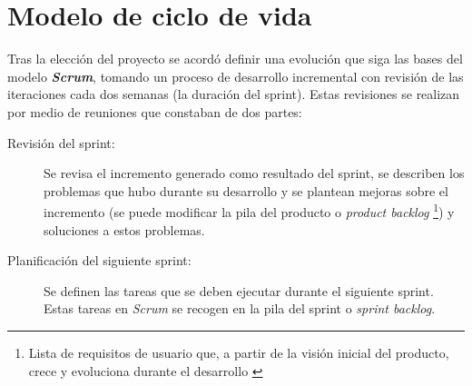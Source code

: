 \section{Modelo de ciclo de vida}

Tras la elección del proyecto se acordó definir una evolución que siga las bases del modelo \textit{\textbf{Scrum}}, tomando un proceso de desarrollo incremental con revisión de las iteraciones cada dos semanas (la duración del sprint). Estas revisiones se realizan por medio de reuniones que constaban de dos partes:
\begin{description}
	\item [Revisión del sprint:] Se revisa el incremento generado como resultado del sprint, se describen los problemas que hubo durante su desarrollo y se plantean mejoras sobre el incremento (se puede modificar la pila del producto o \textit{product backlog} \footnote{Lista de requisitos de usuario que, a partir de la visión inicial del producto, crece y evoluciona durante el desarrollo \citep{scrum_master_scrum_2019}}) y soluciones a estos problemas.
	\item [Planificación del siguiente sprint:] Se definen las tareas que se deben ejecutar durante el siguiente sprint. Estas tareas en \textit{Scrum} se recogen en la pila del sprint o \textit{sprint backlog}.
\end{description}

